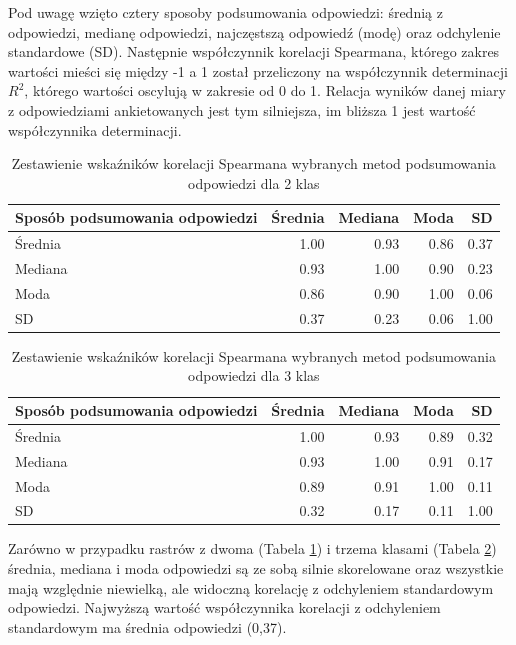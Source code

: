 \documentclass{amuthesis}
\begin{document}
Pod uwagę wzięto cztery sposoby podsumowania odpowiedzi: średnią z
odpowiedzi, medianę odpowiedzi, najczęstszą odpowiedź (modę) oraz
odchylenie standardowe (SD). Następnie współczynnik korelacji Spearmana,
którego zakres wartości mieści się między -1 a 1 został przeliczony na
współczynnik determinacji \(R^2\), którego wartości oscylują w zakresie
od 0 do 1. Relacja wyników danej miary z odpowiedziami ankietowanych
jest tym silniejsza, im bliższa 1 jest wartość współczynnika
determinacji.

\hypertarget{tbl-mc2_cors}{}
\begin{table}
\caption{\label{tbl-mc2_cors}Zestawienie wskaźników korelacji Spearmana wybranych metod podsumowania
odpowiedzi dla 2 klas }\tabularnewline

\centering
\begin{tabular}{lrrrr}
\toprule
Sposób podsumowania
odpowiedzi & Średnia & Mediana & Moda & SD\\
\midrule
Średnia & 1.00 & 0.93 & 0.86 & 0.37\\
Mediana & 0.93 & 1.00 & 0.90 & 0.23\\
Moda & 0.86 & 0.90 & 1.00 & 0.06\\
SD & 0.37 & 0.23 & 0.06 & 1.00\\
\bottomrule
\end{tabular}
\end{table}

\hypertarget{tbl-mc3_cors}{}
\begin{table}
\caption{\label{tbl-mc3_cors}Zestawienie wskaźników korelacji Spearmana wybranych metod podsumowania
odpowiedzi dla 3 klas }\tabularnewline

\centering
\begin{tabular}{lrrrr}
\toprule
Sposób podsumowania
odpowiedzi & Średnia & Mediana & Moda & SD\\
\midrule
Średnia & 1.00 & 0.93 & 0.89 & 0.32\\
Mediana & 0.93 & 1.00 & 0.91 & 0.17\\
Moda & 0.89 & 0.91 & 1.00 & 0.11\\
SD & 0.32 & 0.17 & 0.11 & 1.00\\
\bottomrule
\end{tabular}
\end{table}

Zarówno w przypadku rastrów z dwoma (Tabela \ref{tbl-mc2_cors}) i trzema
klasami (Tabela \ref{tbl-mc3_cors}) średnia, mediana i moda odpowiedzi
są ze sobą silnie skorelowane oraz wszystkie mają względnie niewielką,
ale widoczną korelację z odchyleniem standardowym odpowiedzi. Najwyższą
wartość współczynnika korelacji z odchyleniem standardowym ma średnia
odpowiedzi (0,37).
\end{document}
